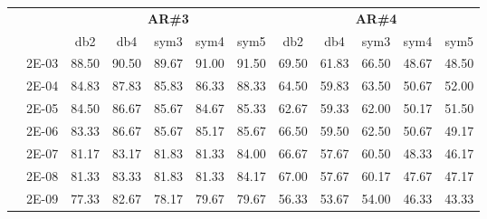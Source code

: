 \begin{table}[H]
\begin{tabular}{|c|c|c c c c c|c c c c c|}
\cline{3-12}
\multicolumn{2}{c}{} & \multicolumn{5}{|c|}{\textbf{AR\#3}}  & \multicolumn{5}{c|}{\textbf{AR\#4}} \\\cline{3-12}
\multicolumn{2}{c}{}  & \multicolumn{1}{|c}{db2} & db4 & sym3 & sym4 & sym5 & db2 & db4& sym3 & sym4 & sym5 \\\hline
\multicolumn{1}{|c|}{ \multirow{6}{*}{\rotatebox[origin=c]{90}{\textbf{Gamma}}} }
&2E-03&	88.50&	90.50&	89.67&	91.00&	91.50&	69.50	&61.83&	66.50&	48.67&	48.50	\\\cline{2-12}
&2E-04&	84.83&	87.83&	85.83&	86.33&	88.33&	64.50	&59.83&	63.50&	50.67&	52.00	\\\cline{2-12}
&2E-05&	84.50&	86.67&	85.67&	84.67&	85.33&	62.67	&59.33&	62.00&	50.17&	51.50	\\\cline{2-12}
&2E-06&	83.33&	86.67&	85.67&	85.17&	85.67&	66.50	&59.50&	62.50&	50.67&	49.17	\\\cline{2-12}
&2E-07&	81.17&	83.17&	81.83&	81.33&	84.00&	66.67	&57.67&	60.50&	48.33&	46.17	\\\cline{2-12}
&2E-08&	81.33&	83.33&	81.83&	81.33&	84.17&	67.00	&57.67&	60.17&	47.67&	47.17	\\\cline{2-12}
&2E-09&	77.33&	82.67&	78.17&	79.67&	79.67&	56.33	&53.67&	54.00&	46.33&	43.33	
\\\midrule
\end{tabular}

\end{table}


